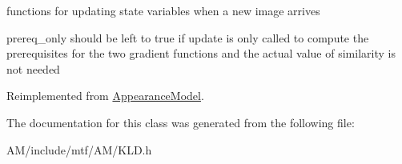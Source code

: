 functions for updating state variables when a new image arrives 

prereq\-\_\-only should be left to true if update is only called to compute the prerequisites for the two gradient functions and the actual value of similarity is not needed 

Reimplemented from \hyperlink{classAppearanceModel_a06136ecd903e85ed2007da2c7b12bd58}{Appearance\-Model}.



The documentation for this class was generated from the following file\-:\begin{DoxyCompactItemize}
\item 
A\-M/include/mtf/\-A\-M/K\-L\-D.\-h\end{DoxyCompactItemize}

